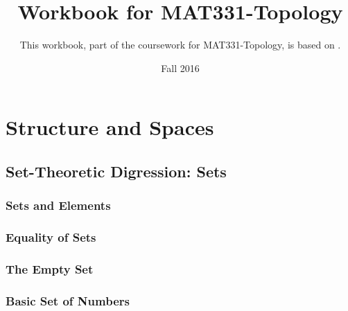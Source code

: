 \documentclass{book}
\title{Workbook for MAT331-Topology}
\date{Fall 2016}
\author{This workbook, part of the coursework for MAT331-Topology, is based on \cite{viro}.}
\begin{document}
	
	\chapter{Structure and Spaces}
		\section{Set-Theoretic Digression: Sets}
			\subsection{Sets and Elements}%
			\subsection{Equality of Sets}%
			\subsection{The Empty Set}%
			\subsection{Basic Set of Numbers}%
\end{document}
